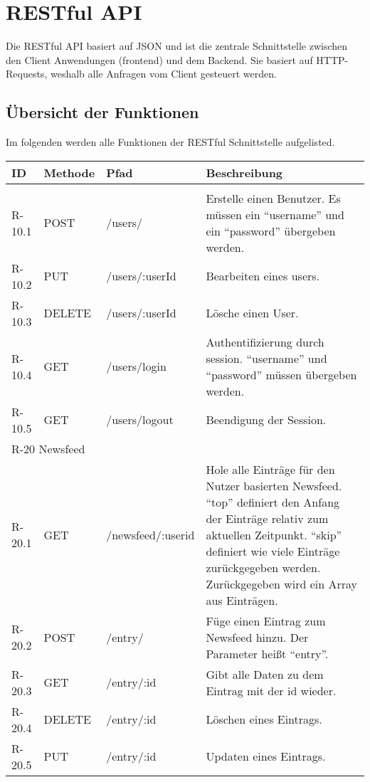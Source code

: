\chapter{RESTful API}
Die RESTful API basiert auf JSON und ist die zentrale Schnittstelle zwischen den Client Anwendungen (frontend) und dem Backend.
Sie basiert auf HTTP-Requests, weshalb alle Anfragen vom Client gesteuert werden.

\section{Übersicht der Funktionen}
Im folgenden werden alle Funktionen der RESTful Schnittstelle aufgelisted. 
\begin{tabularx}{\textwidth}{|l|l|l|X|}
    \toprule
    \textbf{ID} & \textbf{Methode} & \textbf{Pfad} & \textbf{Beschreibung} \\
    \midrule
    \endhead
    \hline
    \caption{RESTful Pfade}
    \label{RESTful:pfade}
    \endfoot

    \multicolumn{4}{|l|}{R-10 Userverwaltung}\\
    \hline

    R-10.1 & POST & /users/ & Erstelle einen Benutzer. Es müssen ein \enquote{username} und ein \enquote{password} übergeben werden.\\
    R-10.2 & PUT & /users/:userId & Bearbeiten eines users.\\
    R-10.3 & DELETE & /users/:userId & Lösche einen User.\\
    R-10.4 & GET & /users/login & Authentifizierung durch session. \enquote{username} und \enquote{password} müssen übergeben werden.\\
    R-10.5 & GET & /users/logout & Beendigung der Session.\\

    \hline
    \multicolumn{4}{|l|}{R-20 Newsfeed}\\
    \hline

    R-20.1 & GET & /newsfeed/:userid & Hole alle Einträge für den Nutzer basierten Newsfeed. \enquote{top} definiert den Anfang der Einträge relativ zum aktuellen Zeitpunkt. \enquote{skip} definiert wie viele Einträge zurückgegeben werden. Zurückgegeben wird ein Array aus Einträgen.\\ 
    R-20.2 & POST & /entry/ & Füge einen Eintrag zum Newsfeed hinzu. Der Parameter heißt \enquote{entry}.\\ 
    R-20.3 & GET & /entry/:id & Gibt alle Daten zu dem Eintrag mit der id wieder.\\
    R-20.4 & DELETE & /entry/:id & Löschen eines Eintrags.\\
    R-20.5 & PUT & /entry/:id & Updaten eines Eintrags.\\


\end{tabularx}
